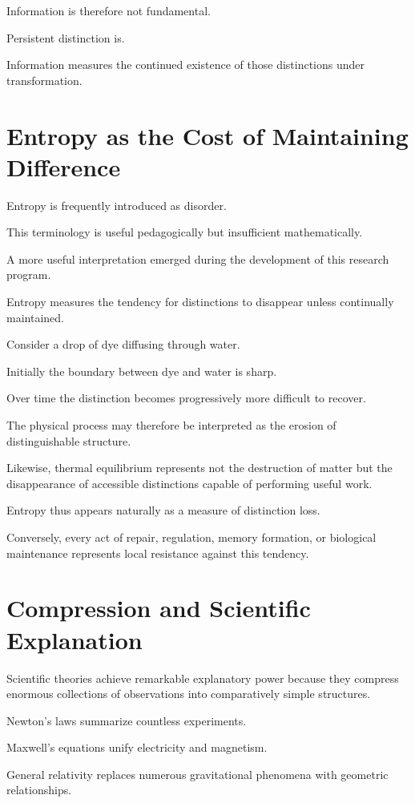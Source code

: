 \documentclass[11pt,oneside]{book}
\numberwithin{equation}{chapter}
\theoremstyle{definition}
\theoremstyle{plain}
\begin{document}
Information is therefore not fundamental.

Persistent distinction is.

Information measures the continued existence of those distinctions under
transformation.

\section{Entropy as the Cost of Maintaining Difference}

Entropy is frequently introduced as disorder.

This terminology is useful pedagogically but insufficient mathematically.

A more useful interpretation emerged during the development of this research
program.

Entropy measures the tendency for distinctions to disappear unless
continually maintained.

Consider a drop of dye diffusing through water.

Initially the boundary between dye and water is sharp.

Over time the distinction becomes progressively more difficult to recover.

The physical process may therefore be interpreted as the erosion of
distinguishable structure.

Likewise, thermal equilibrium represents not the destruction of matter but
the disappearance of accessible distinctions capable of performing useful
work.

Entropy thus appears naturally as a measure of distinction loss.

Conversely, every act of repair, regulation, memory formation, or biological
maintenance represents local resistance against this tendency.

\section{Compression and Scientific Explanation}

Scientific theories achieve remarkable explanatory power because they
compress enormous collections of observations into comparatively simple
structures.

Newton's laws summarize countless experiments.

Maxwell's equations unify electricity and magnetism.

General relativity replaces numerous gravitational phenomena with geometric
relationships.
\end{document}
